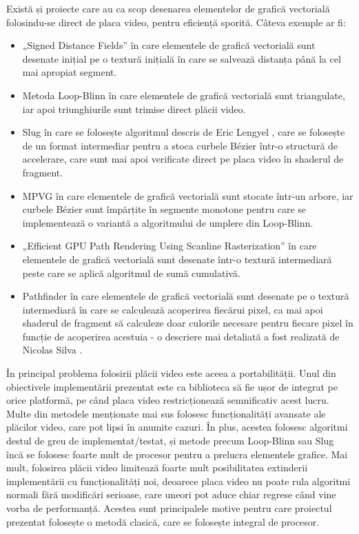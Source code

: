 \documentclass[a4paper, 12pt]{report}
\begin{document}
Există și proiecte care au ca scop desenarea elementelor de grafică vectorială folosindu-se direct de placa video, pentru
eficiență sporită. Câteva exemple ar fi:

\begin{itemize}
    \item{„Signed Distance Fields” \cite{SDF_valve_paper} în care elementele de grafică vectorială sunt desenate inițial pe
                o textură inițială în care se salvează distanța până la cel mai apropiat segment.}
    \item{Metoda Loop-Blinn \cite{Loop-Blinn_algorithm} în care elementele de grafică vectorială sunt triangulate, iar apoi
                triunghiurile sunt trimise direct plăcii video.}
    \item{Slug \cite{Slug_library} în care se folosește algoritmul descris de Eric Lengyel \cite{Slug_paper}, care se folosește
                de un format intermediar pentru a stoca curbele Bézier într-o structură de accelerare, care sunt mai apoi verificate
                direct pe placa video în shaderul de fragment.}
    \item{MPVG \cite{MPVG_paper} în care elementele de grafică vectorială sunt stocate într-un arbore, iar curbele Bézier sunt
                împărțite în segmente monotone pentru care se implementează o variantă a algoritmului de umplere din Loop-Blinn.}
    \item{„Efficient GPU Path Rendering Using Scanline Rasterization” \cite{GPU_Scanline_paper} în care elementele de grafică
                vectorială sunt desenate într-o textură intermediară peste care se aplică algoritmul de sumă cumulativă.}
    \item{Pathfinder \cite{pathfinder_library} în care elementele de grafică vectorială sunt desenate pe o textură intermediară
                în care se calculează acoperirea fiecărui pixel, ca mai apoi shaderul de fragment să calculeze doar culorile necesare pentru
                fiecare pixel în funcție de acoperirea acestuia - o descriere mai detaliată a fost realizată de Nicolas Silva \cite{pathfinder_algorithm}.}
\end{itemize}

În principal problema folosirii plăcii video este aceea a portabilității. Unul din obiectivele implementării prezentat este ca biblioteca să
fie ușor de integrat pe orice platformă, pe când placa video restricționează semnificativ acest lucru. Multe din metodele
menționate mai sus folosesc funcționalități avansate ale plăcilor video, care pot lipsi în anumite cazuri. În plus, acestea
folosesc algoritmi destul de greu de implementat/testat, și metode precum Loop-Blinn sau Slug încă se folosesc foarte mult
de procesor pentru a prelucra elementele grafice. Mai mult, folosirea plăcii video limitează foarte mult posibilitatea extinderii
implementării cu funcționalități noi, deoarece placa video nu poate rula algoritmi normali fără modificări serioase, care uneori
pot aduce chiar regrese când vine vorba de performanță. Acestea sunt principalele motive pentru care proiectul prezentat folosește o
metodă clasică, care se folosește integral de procesor.
\end{document}
